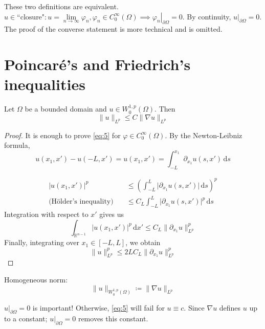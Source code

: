 \documentclass{report}
\begin{document}
\mlemma{}
{
    These two definitions are equivalent. \(u \in \text{``closure"} \colon u = \lim\limits_{n \to \infty} \varphi_{n}, \varphi_{n} \in C^{\infty}_{0}(\Omega) \implies \left. \varphi_{n} \right|_{\partial \Omega} = 0\). By continuity, \(\left. u \right|_{\partial \Omega} = 0\). The proof of the converse statement is more technical and is omitted.
}

\section{Poincaré's and Friedrich's inequalities}
{
    Let \(\Omega\) be a bounded domain and \(u \in W^{1, p}_{0}(\Omega)\). Then
    \begin{equation}\label{eq:5}
        \|u\|_{L^{p}} \leq C \|\nabla u\|_{L^{p}} 
    \end{equation}
}

\begin{proof}
    It is enough to prove \ref{eq:5} for \(\varphi \in C^{\infty}_{0}(\Omega)\). By the Newton-Leibniz formula,
    \[    
        u(x_1, x') - u(-L, x') = u(x_1, x') = \int_{-L}^{x_1} \partial_{x_1}u(s, x') \,\mathrm{d}s 
    \] 

    \begin{align*}
        \vert u(x_1, x') \vert ^{p} &\leq \left(\int_{-L}^{L} \vert \partial_{x_1}u(s, x') \vert \,\mathrm{d}s \right)^{p} \\
        \text{(Hölder's inequality)} \quad & \leq C_{L} \int_{-L}^{L} \vert \partial_{x_1}u(s, x') \vert^{p} \,\mathrm{d}s
    \end{align*}
    Integration with respect to $x'$ gives us
    \[
        \int_{\mathbb{R}^{n-1}} \vert u(x_1, x') \vert ^{p} \,\mathrm{d}x' \leq C_{L}\|\partial_{x_1}u\|_{L^{p}}^{p}
    \]
    Finally, integrating over \(x_1 \in [-L, L]\), we obtain
    \[
        \|u\|_{L^{p}}^{p} \leq 2LC_{L} \|\partial_{x_1}u\|_{L^{p}}^{p}
    \]
\end{proof}

{
    Homogeneous norm:
    \[
        \|u\|_{W^{1, p}_{0}(\Omega)} \coloneqq \|\nabla u\|_{L^{p}}
    \]
}

\begin{note}
    \(\left. u \right|_{\partial \Omega} = 0\) is important! Otherwise, \ref{eq:5} will fail for \(u \equiv c\). Since \(\nabla u\) defines \(u\) up to a constant; \(\left. u \right|_{\partial \Omega} = 0\) removes this constant.
\end{note}
\end{document}
